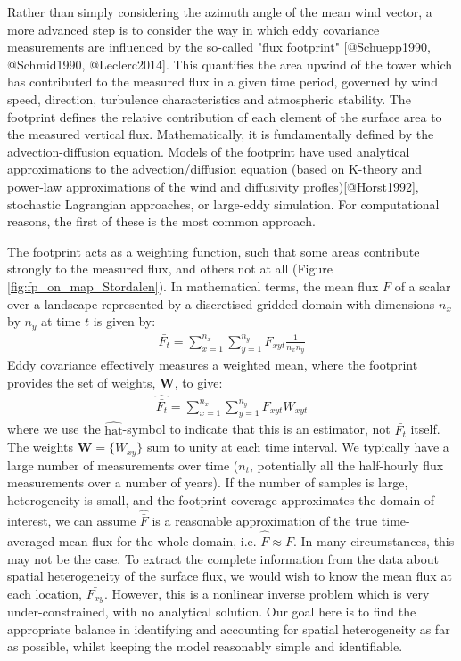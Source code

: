 Rather than simply considering the azimuth angle of the mean wind vector, a more advanced step is to consider the way in which eddy covariance measurements are influenced by the so-called "flux footprint" [@Schuepp1990, @Schmid1990, @Leclerc2014]. This quantifies the area upwind of the tower which has contributed to the measured flux in a given time period, governed by wind speed, direction, turbulence characteristics and atmospheric stability. The footprint defines the relative contribution of each element of the surface area to the measured vertical flux. Mathematically, it is fundamentally defined by the advection-diffusion equation. Models of the footprint have used analytical approximations to the advection/diffusion equation (based on K-theory and power-law approximations of the wind and diffusivity profles)[@Horst1992], stochastic Lagrangian approaches, or large-eddy simulation. For computational reasons, the first of these is the most common approach.

The footprint acts as a weighting function, such that some areas contribute strongly to the measured flux, and others not at all (Figure \ref{fig:fp_on_map_Stordalen}). In mathematical terms, the mean flux $F$ of a scalar over a landscape represented by a discretised gridded domain with dimensions $n_x$ by $n_y$ at time $t$ is given by:
\begin{align}   \label{eq:simpleMean}
  \bar{F_t} = \sum_{x = 1}^{n_x} \sum_{y = 1}^{n_y} F_{xyt} \frac{1}{n_x n_y}
\end{align}
Eddy covariance effectively measures a weighted mean, where the footprint provides the set of weights, $\mathbf{W}$, to give:
\begin{align}   \label{eq:weightMean}
  \widehat{\bar{F_t}} = \sum_{x = 1}^{n_x} \sum_{y = 1}^{n_y} F_{xyt} W_{xyt}
\end{align}
where we use the $\widehat{\mathrm{hat}}$-symbol to indicate that this is an estimator, not $\bar{F_t}$ itself. The weights $\mathbf{W} = \{W_{xy}\}$ sum to unity at each time interval.  We typically have a large number of measurements over time ($n_t$, potentially all the half-hourly flux measurements over a number of years). If the number of samples is large, heterogeneity is small, and the footprint coverage approximates the domain of interest, we can assume $\widehat{\bar{F}}$ is a reasonable approximation of the true time-averaged mean flux for the whole domain, i.e. $\widehat{\bar{F}} \approx \bar{F}$. In many circumstances, this may not be the case. To extract the complete information from the data about spatial heterogeneity of the surface flux, we would wish to know the mean flux at each location, $\bar{F_{xy}}$. However, this is a nonlinear inverse problem which is very under-constrained, with no analytical solution. Our goal here is to find the appropriate balance in identifying and accounting for spatial heterogeneity as far as possible, whilst keeping the model reasonably simple and identifiable.

